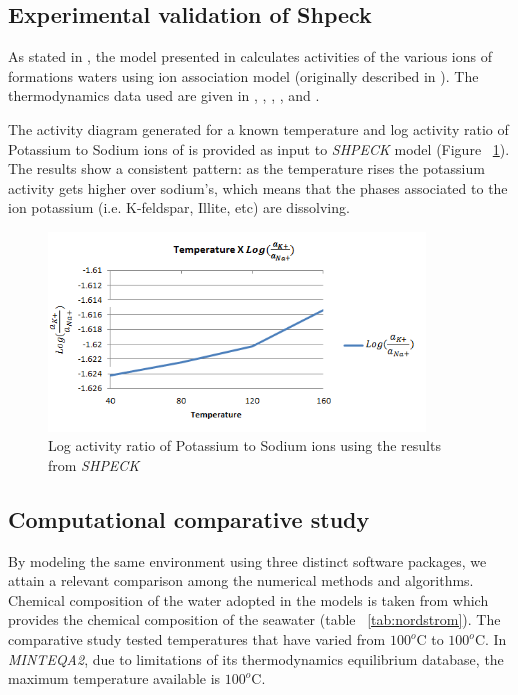 \subsection{Experimental validation of Shpeck}
As stated in \cite{Morad:90}, the model presented in \cite{Egeberg:88} calculates activities of the various ions of formations waters using ion association model (originally described in \cite{Wigley:77}). 
The thermodynamics data used are given in \cite{Helgeson:74a},  \cite{Helgeson:74b}, \cite{Helgeson:76}, \cite{Waltter:77}, \cite{Helgeson:78} and \cite{Helgeson:81}.

The activity diagram generated for a known temperature and log activity ratio of Potassium to Sodium ions of \cite{Aagaard:90}  is provided as input to \emph{SHPECK} model (Figure ~\ref{fig:tempXactratio}). The results show a consistent pattern: as the temperature rises the potassium activity gets higher over sodium’s, which means that the phases associated to the ion potassium (i.e. K-feldspar, Illite, etc) are dissolving.


\begin{figure}[ht!]
\centering
\includegraphics[width=100mm]{figures/tempXactratio.png}
\caption{Log activity ratio of Potassium to Sodium ions using the results from \emph{SHPECK}}
\label{fig:tempXactratio}
\end{figure}



\subsection{Computational comparative study} 
By modeling the same environment using three distinct software packages, we attain a relevant comparison among the numerical methods and algorithms.
Chemical composition of the water adopted in the models is taken from  \cite{Nordstrom:79} which provides the chemical composition of the seawater (table ~\ref{tab:nordstrom}). The comparative study tested temperatures that have varied from $100^o$C to $100^o$C. In \emph{MINTEQA2}, due to limitations of its thermodynamics equilibrium database, the maximum temperature available is $100^o$C.


